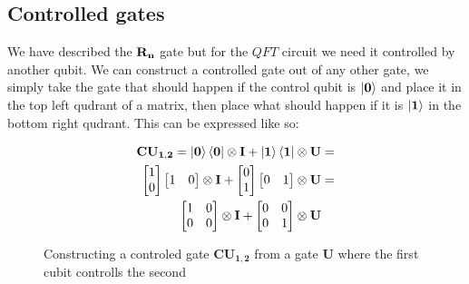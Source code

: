 \subsection{Controlled gates}
\newcommand{\qtcr}[1]{\mathbf{CR_{#1}}}
We have described the $\mathbf{R_{n}}$ gate but for the $QFT$ circuit we need it controlled by another qubit. We can construct a controlled gate out of any other gate, we simply take the gate that should happen if the control qubit is $\ket{\mathbf{0}}$ and place it in the top left qudrant of a matrix, then place what should happen if it is $\ket{\mathbf{1}}$ in the bottom right qudrant. 
This can be expressed like so: 
\begin{figure}[H]
    \begin{align*}
        \mathbf{CU_{1,2}}=\ket{\mathbf{0}}\bra{\mathbf{0}}\otimes\mathbf{I} + \ket{\mathbf{1}}\bra{\mathbf{1}}\otimes\mathbf{U}&=\\
        \begin{bmatrix}
            1 \\
            0 \\
        \end{bmatrix}
        \begin{bmatrix}
            1 & 0 \\
        \end{bmatrix}
        \otimes\mathbf{I} + 
        \begin{bmatrix}
            0 \\
            1 \\
        \end{bmatrix}
        \begin{bmatrix}
            0 & 1 \\
        \end{bmatrix}
        \otimes\mathbf{U}&=\\
        \begin{bmatrix}
            1 & 0 \\
            0 & 0 \\
        \end{bmatrix}
        \otimes\mathbf{I} + 
        \begin{bmatrix}
            0 & 0 \\
            0 & 1 \\
        \end{bmatrix}
        \otimes\mathbf{U}& 
    \end{align*}
    \caption{Constructing a controled gate $\mathbf{CU_{1,2}}$ from a gate $\mathbf{U}$ where the first cubit controlls the second}
    \label{fig:CU1}
\end{figure}
